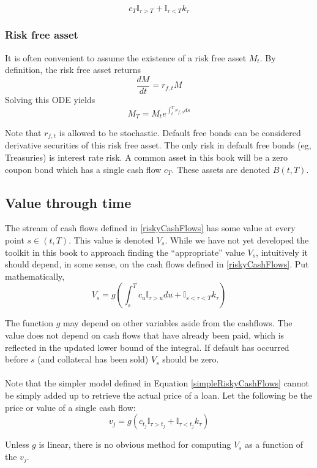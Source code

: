\documentclass{article}
\theoremstyle{definition}
\begin{document}
\begin{equation} \label{simpleRiskyCashFlows}
c_T \mathbb{I}_{\tau>T}+\mathbb{I}_{\tau<T} k_\tau
\end{equation}


\subsubsection{Risk free asset}

It is often convenient to assume the existence of a risk free asset \(M_t\).  By definition, the risk free asset returns
\[\frac{dM}{dt}=r_{f, t} M\]
Solving this ODE yields
\[M_T=M_t e^{\int_t ^T r_{f, s} ds}\]

Note that \(r_{f, t}\) is allowed to be stochastic.  Default free bonds can be considered derivative securities of this risk free asset.  The only risk in default free bonds (eg, Treasuries) is interest rate risk.  A common asset in this book will be a zero coupon bond which has a single cash flow \(c_T\).  These assets are denoted \(B(t, T)\). 

\subsection{Value through time}
\label{valOfCashFlows}
The stream of cash flows defined in \ref{riskyCashFlows} has some value at every point \(s \in (t, T)\).  This value is denoted \(V_s\).  While we have not yet developed the toolkit in this book to approach finding the ``appropriate'' value \(V_s\), intuitively it should depend, in some sense, on the cash flows defined in \ref{riskyCashFlows}.  Put mathematically, 
\[V_s=g\left(   \int_s ^ T c_u \mathbb{I}_{\tau>u} du+\mathbb{I}_{s<\tau<T} k_\tau  \right) \]

The function \(g\) may depend on other variables aside from the cashflows.  The value does not depend on cash flows that have already been paid, which is reflected in the updated lower bound of the integral.  If default has occurred before \(s\) (and collateral has been sold) \(V_s\) should be zero.
\\
\\
Note that the simpler model defined in Equation \ref{simpleRiskyCashFlows} cannot be simply added up to retrieve the actual price of a loan.  Let the following be the price or value of a single cash flow:
\[
v_j= g\left(c_{t_j} \mathbb{I}_{\tau>t_j}+\mathbb{I}_{\tau<t_j} k_\tau\right)
\]

Unless \(g\) is linear, there is no obvious method for computing \(V_s\) as a function of the \(v_j\).
\end{document}
